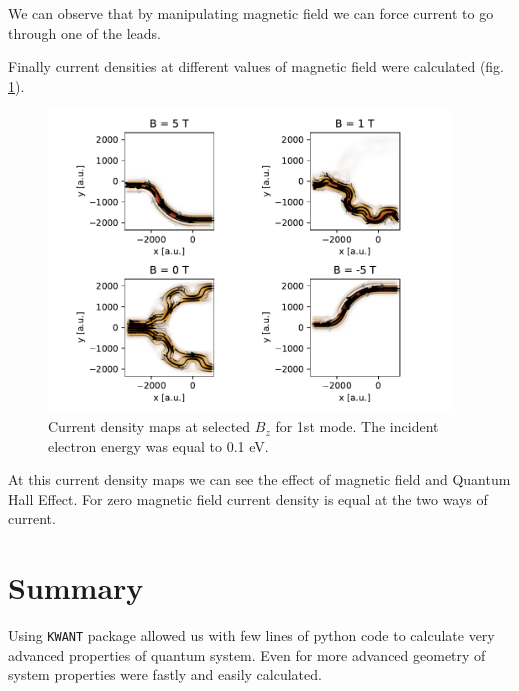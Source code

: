 \documentclass[12pt, a4paper]{article}
\begin{document}
We can observe that by manipulating magnetic field we can force current to go through one of the leads.

Finally current densities at different values of magnetic field were calculated (fig. \ref{fig:ex3_currents}).

\begin{figure}[H]
    \begin{center}
        \includegraphics[width=0.95\textwidth]{../plots/current_ex3.pdf}
    \end{center}
    \caption{Current density maps at selected $B_z$ for 1st mode. The incident electron energy was equal to 0.1 eV.}
    \label{fig:ex3_currents}
\end{figure}

At this current density maps we can see the effect of magnetic field and Quantum Hall Effect.
For zero magnetic field current density is equal at the two ways of current.

\section*{Summary}

Using \texttt{KWANT} package allowed us with few lines of python code to calculate very advanced properties of quantum system.
Even for more advanced geometry of system properties were fastly and easily calculated.
\end{document}
